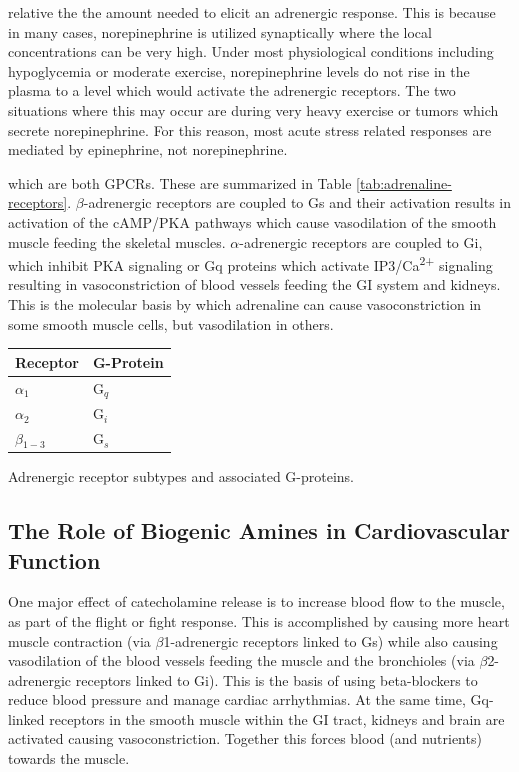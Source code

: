 \documentclass{tufte-handout}
\begin{document}
 relative the the amount needed to elicit an adrenergic response.  This is because in many cases, norepinephrine is utilized synaptically where the local concentrations can be very high.  Under most physiological conditions including hypoglycemia or moderate exercise, norepinephrine levels do not rise in the plasma to a level which would activate the adrenergic receptors.  The two situations where this may occur are during very heavy exercise or tumors which secrete norepinephrine.  For this reason, most acute stress related responses are mediated by epinephrine, not norepinephrine.

 which are both GPCRs.  These are summarized in Table \ref{tab:adrenaline-receptors}.  $\beta$-adrenergic receptors are coupled to Gs and their activation results in activation of the cAMP/PKA pathways which cause vasodilation of the smooth muscle feeding the skeletal muscles.  $\alpha$-adrenergic receptors are coupled to Gi, which inhibit PKA signaling or Gq proteins which activate IP3/Ca\textsuperscript{2+} signaling resulting in vasoconstriction of blood vessels feeding the GI system and kidneys.  This is the molecular basis by which adrenaline can cause vasoconstriction in some smooth muscle cells, but vasodilation in others.

\begin{margintable}[+1cm]
  \centering
  \begin{tabular}{ll}
    \toprule
    Receptor & G-Protein \\
    \midrule
    $\alpha$$_1$ & G$_q$ \\
    $\alpha$$_2$ & G$_i$ \\
    $\beta$$_{1-3}$ & G$_s$ \\
    \bottomrule
  \end{tabular}
  \caption{Adrenergic receptor subtypes and associated G-proteins.}
  \label{tab:adrenaline-receptors}
\end{margintable}

\subsection{The Role of Biogenic Amines in Cardiovascular Function}

One major effect of catecholamine release is to increase blood flow to the muscle, as part of the flight or fight response.  This is accomplished by causing more heart muscle contraction (via $\beta$1-adrenergic receptors linked to Gs) while also causing vasodilation of the blood vessels feeding the muscle and the bronchioles (via $\beta$2-adrenergic receptors linked to Gi).  This is the basis of using beta-blockers to reduce blood pressure and manage cardiac arrhythmias. At the same time, Gq-linked receptors in the smooth muscle within the GI tract, kidneys and brain are activated causing vasoconstriction.  Together this forces blood (and nutrients) towards the muscle.  
\end{document}
